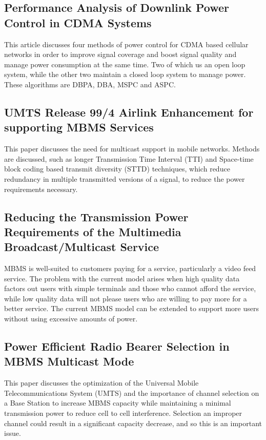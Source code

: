 \documentclass{article}
\begin{document}
\subsection{Performance Analysis of Downlink Power Control in CDMA
  Systems}

This article discusses four methods of power control for CDMA based
cellular networks in order to improve signal coverage and boost signal
quality and manage power consumption at the same time. Two of which us
an open loop system, while the other two maintain a closed loop system
to manage power. These algorithms are DBPA, DBA, MSPC and
ASPC.~\cite{das2003performance}

\subsection{UMTS Release 99/4 Airlink Enhancement for supporting MBMS
  Services}

This paper discusses the need for multicast support in mobile
networks. Methods are discussed, such as longer Transmission Time
Interval (TTI) and Space-time block coding based transmit diversity
(STTD) techniques, which reduce redundancy in multiple transmitted
versions of a signal, to reduce the power requirements
necessary.~\cite{chuah2004umts}

\subsection{Reducing the Transmission Power Requirements of the
  Multimedia Broadcast/Multicast Service}

MBMS is well-suited to customers paying for a service, particularly a
video feed service. The problem with the current model arises when
high quality data factors out users with simple terminals and those
who cannot afford the service, while low quality data will not please
users who are willing to pay more for a better service. The current
MBMS model can be extended to support more users without using
excessive amounts of power.~\cite{xylomenos2007reducing}

\subsection{Power Efficient Radio Bearer Selection in MBMS Multicast
  Mode}

This paper discusses the optimization of the Universal Mobile
Telecommunications System (UMTS) and the importance of channel
selection on a Base Station to increase MBMS capacity while
maintaining a minimal transmission power to reduce cell to cell
interference. Selection an improper channel could result in a
significant capacity decrease, and so this is an important
issue.~\cite{alexiou2007power}
\end{document}
